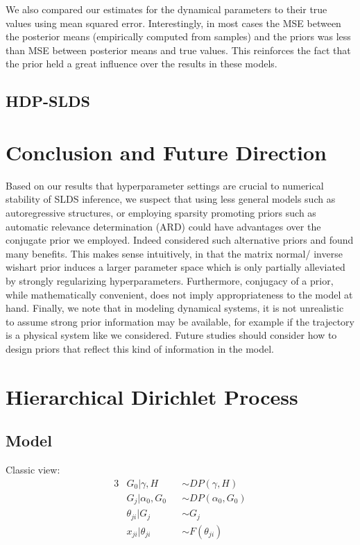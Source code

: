 \documentclass{article} %
\begin{document}
We also compared our estimates for the dynamical parameters to their true values using mean squared error. Interestingly, in most cases the MSE between the posterior means (empirically computed from samples) and the priors was less than MSE between posterior means and true values. This reinforces the fact that the prior held a great influence over the results in these models.

\subsection{HDP-SLDS}

\section{Conclusion and Future Direction}

Based on our results that hyperparameter settings are crucial to numerical stability of SLDS inference, we suspect that using less general models such as autoregressive structures, or employing sparsity promoting priors such as automatic relevance determination (ARD) could have advantages over the conjugate prior we employed. Indeed \cite{fox_bayesian_2009} considered such alternative priors and found many benefits. This makes sense intuitively, in that the matrix normal/ inverse wishart prior induces a larger parameter space which is only partially alleviated by strongly regularizing hyperparameters. Furthermore, conjugacy of a prior, while mathematically convenient, does not imply appropriateness to the model at hand. Finally, we note that in modeling dynamical systems, it is not unrealistic to assume strong prior information may be available, for example if the trajectory is a physical system like we considered. Future studies should consider how to design priors that reflect this kind of information in the model.


\clearpage
\appendix
\section{Hierarchical Dirichlet Process}

\subsection{Model}

Classic view:
\begin{alignat*}{3}
& G_0 | \gamma, H && \sim DP(\gamma, H) \\
& G_j | \alpha_0, G_0 && \sim DP(\alpha_0, G_0) \\
& \theta_{ji} | G_j && \sim G_j \\
& x_{ji} | \theta_{ji} && \sim F(\theta_{ji})
\end{alignat*}
\end{document}
